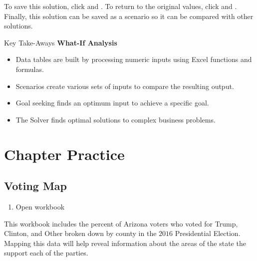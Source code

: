To save this solution, click  and . To return to the original values, click  and . Finally, this solution can be saved as a scenario so it can be compared with other solutions.

\begin{center}
	\begin{tkwbox}{Key Take-Aways}
		\textbf{What-If Analysis}
		\\
		\begin{itemize}
			\setlength{\itemsep}{0pt}
			\setlength{\parskip}{0pt}
			\setlength{\parsep}{0pt}
			
			\item Data tables are built by processing numeric inputs using Excel functions and formulas.
			\item Scenarios create various sets of inputs to compare the resulting output.
			\item Goal seeking finds an optimum input to achieve a specific goal.
			\item The Solver finds optimal solutions to complex business problems.
			
		\end{itemize}
	\end{tkwbox}
\end{center}

\section{Chapter Practice}

\subsection{Voting Map}

\begin{enumerate}
	\item Open workbook 
\end{enumerate}

This workbook includes the percent of Arizona voters who voted for Trump, Clinton, and Other broken down by county in the $ 2016 $ Presidential Election. Mapping this data will help reveal information about the areas of the state the support each of the parties.

